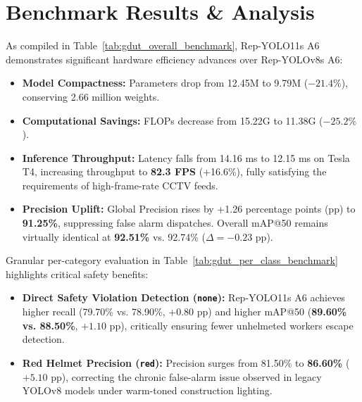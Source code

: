\documentclass[conference]{IEEEtran}
\begin{document}
\section{Benchmark Results \& Analysis}
As compiled in Table~\ref{tab:gdut_overall_benchmark}, Rep-YOLO11s A6 demonstrates significant hardware efficiency advances over Rep-YOLOv8s A6:
\begin{itemize}
    \item \textbf{Model Compactness:} Parameters drop from 12.45M to 9.79M ($-21.4\%$), conserving 2.66 million weights.
    \item \textbf{Computational Savings:} FLOPs decrease from 15.22G to 11.38G ($-25.2\%$).
    \item \textbf{Inference Throughput:} Latency falls from 14.16 ms to 12.15 ms on Tesla T4, increasing throughput to \textbf{82.3 FPS} (+16.6\%), fully satisfying the requirements of high-frame-rate CCTV feeds.
    \item \textbf{Precision Uplift:} Global Precision rises by +1.26 percentage points (pp) to \textbf{91.25\%}, suppressing false alarm dispatches. Overall mAP@50 remains virtually identical at \textbf{92.51\%} vs. 92.74\% ($\Delta = -0.23$ pp).
\end{itemize}

Granular per-category evaluation in Table~\ref{tab:gdut_per_class_benchmark} highlights critical safety benefits:
\begin{itemize}
    \item \textbf{Direct Safety Violation Detection (\texttt{none}):} Rep-YOLO11s A6 achieves higher recall (79.70\% vs. 78.90\%, $+0.80$ pp) and higher mAP@50 (\textbf{89.60\% vs. 88.50\%}, $+1.10$ pp), critically ensuring fewer unhelmeted workers escape detection.
    \item \textbf{Red Helmet Precision (\texttt{red}):} Precision surges from 81.50\% to \textbf{86.60\%} ($+5.10$ pp), correcting the chronic false-alarm issue observed in legacy YOLOv8 models under warm-toned construction lighting.
\end{itemize}
\end{document}
